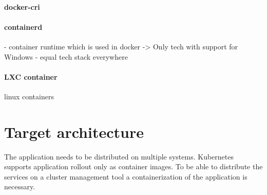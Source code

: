 \paragraph{docker-cri}
\paragraph{containerd}
	- container runtime which is used in docker
	-> Only tech with support for Windows - equal tech stack everywhere
\paragraph{LXC container}
	linux containers






\section{Target architecture}
The application needs to be distributed on multiple systems. Kubernetes supports application rollout only as container images. To be able to distribute the services on a cluster management tool a containerization of the application is necessary.